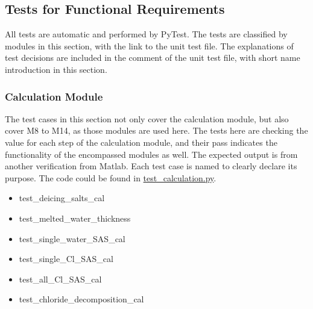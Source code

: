 \documentclass[12pt, titlepage]{article}
\begin{document}

\subsection{Tests for Functional Requirements}
All tests are automatic and performed by PyTest. The tests are classified by modules in this section, with the link to the unit test file. The explanations of test decisions are included in the comment of the unit test file, with short name introduction in this section.


\subsubsection{Calculation Module} \label{CM}
The test cases in this section not only cover the calculation module, but also cover M8 to M14, as those modules are used here. The tests here are checking the value for each step of the calculation module, and their pass indicates the functionality of the encompassed modules as well. The expected output is from another verification from Matlab. Each test case is named to clearly declare its purpose. The code could be found in \href{https://github.com/CynthiaLiu0805/BridgeCorrosion/blob/main/src/database/test_calculation.py}{test\_calculation.py}.
\begin{itemize}
\item test\_deicing\_salts\_cal
\item test\_melted\_water\_thickness
\item test\_single\_water\_SAS\_cal
\item test\_single\_Cl\_SAS\_cal
\item test\_all\_Cl\_SAS\_cal
\item test\_chloride\_decomposition\_cal
\end{itemize}
\end{document}

